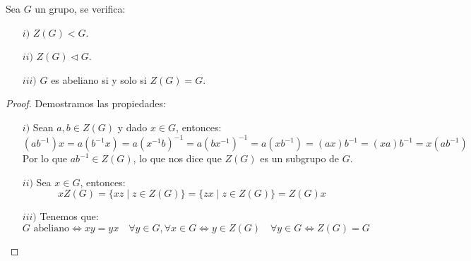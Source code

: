 \begin{prop}
    Sea $G$ un grupo, se verifica:
    \begin{enumerate}
        \item[$i)$] $Z(G)<G$.
        \item[$ii)$] $Z(G)\lhd G$.
        \item[$iii)$] $G$ es abeliano si y solo si $Z(G) = G$.
    \end{enumerate}
    \begin{proof}
        Demostramos las propiedades:
        \begin{enumerate}
            \item[$i)$] Sean $a,b\in Z(G)$ y dado $x\in G$, entonces:
                \begin{equation*}
                    (ab^{-1})x = a(b^{-1}x) = a{(x^{-1}b)}^{-1} = a{(bx^{-1})}^{-1} = a(xb^{-1}) = (ax)b^{-1} = (xa)b^{-1} = x(ab^{-1})
                \end{equation*}
                Por lo que $ab^{-1}\in Z(G)$, lo que nos dice que $Z(G)$ es un subgrupo de $G$.
            \item[$ii)$] Sea $x\in G$, entonces:
                \begin{equation*}
                    xZ(G) = \{xz \mid z\in Z(G)\} = \{zx \mid z\in Z(G)\} = Z(G)x
                \end{equation*}
            \item[$iii)$] Tenemos que:
                \begin{equation*}
                    G \text{\ abeliano} \Longleftrightarrow xy = yx \quad \forall y\in G, \forall x\in G \Longleftrightarrow y\in Z(G) \quad \forall y\in G \Longleftrightarrow Z(G) = G
                \end{equation*}
        \end{enumerate}
    \end{proof}
\end{prop}

